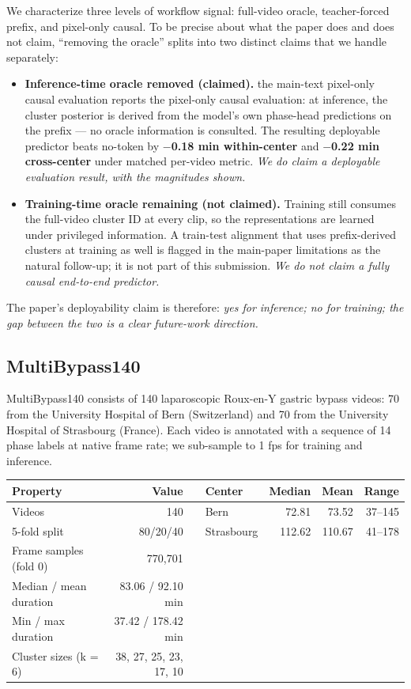 We characterize three levels of workflow signal: full-video oracle,
teacher-forced prefix, and pixel-only causal. To be precise about what
the paper does and does not claim, ``removing the oracle'' splits into
two distinct claims that we handle separately:

\begin{itemize}
\tightlist
\item
  \textbf{Inference-time oracle removed (claimed).} the main-text pixel-only causal evaluation reports the
  pixel-only causal evaluation: at inference, the cluster posterior is
  derived from the model's own phase-head predictions on the prefix ---
  no oracle information is consulted. The resulting deployable predictor
  beats no-token by \textbf{$-$0.18 min within-center} and \textbf{$-$0.22
  min cross-center} under matched per-video metric. \emph{We do claim a
  deployable evaluation result, with the magnitudes shown.}
\item
  \textbf{Training-time oracle remaining (not claimed).} Training still
  consumes the full-video cluster ID at every clip, so the
  representations are learned under privileged information. A train-test
  alignment that uses prefix-derived clusters at training as well is
  flagged in the main-paper limitations as the natural follow-up; it is not part of this
  submission. \emph{We do not claim a fully causal end-to-end
  predictor.}
\end{itemize}

The paper's deployability claim is therefore: \emph{yes for inference;
no for training; the gap between the two is a clear future-work
direction.}

\subsection{MultiBypass140}\label{multibypass140}

MultiBypass140 \citep{lavanchy2024multibypass} consists of 140 laparoscopic
Roux-en-Y gastric bypass videos: 70 from the University Hospital of Bern
(Switzerland) and 70 from the University Hospital of Strasbourg
(France). Each video is annotated with a sequence of 14 phase labels at
native frame rate; we sub-sample to 1 fps for training and inference.

\begin{longtable}[]{@{}lrllrrr@{}}
\toprule\noalign{}
Property & Value & & Center & Median & Mean & Range \\
\midrule\noalign{}
\endhead
\bottomrule\noalign{}
\endlastfoot
Videos & 140 & & Bern & 72.81 & 73.52 & 37--145 \\
5-fold split & 80/20/40 & & Strasbourg & 112.62 & 110.67 & 41--178 \\
Frame samples (fold 0) & 770,701 & & & & & \\
Median / mean duration & 83.06 / 92.10 min & & & & & \\
Min / max duration & 37.42 / 178.42 min & & & & & \\
Cluster sizes (k = 6) & 38, 27, 25, 23, 17, 10 & & & & & \\
\end{longtable}

